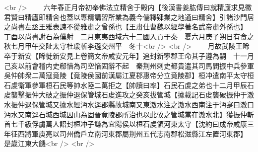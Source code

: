 <br />
　　六年春正月帝初奉佛法立精舍于殿内【後漢書姜肱傳曰就精廬求見徵君賢曰精廬即精舍也蓋以專精講習所業為義今儒釋肄業之地通曰精舍】引諸沙門居之尚書左丞王雅表諫不從雅肅之曾孫也【王肅仕曹魏以經學著名武帝肅外孫也】　丁酉以尚書謝石為僕射　二月東夷西域六十二國入貢于秦　夏六月庚子朔日有食之秋七月甲午交阯太守杜瑗斬李遜交州平　冬十<br />
<br />
　　月故武陵王晞卒于新安【晞徙新安見上卷簡文帝咸安元年】追封新寧郡王命其子遵為嗣　十一月己亥以前會稽内史郗愔為司空愔固辭不起　秦荆州刺史都貴遣其司馬閻振中兵參軍吳仲帥衆二萬寇竟陵【竟陵侯國前漢屬江夏郡惠帝分立竟陵郡】桓冲遣南平太守桓石䖍衛軍參軍桓石民等帥水陸二萬拒之【帥讀曰率】石民石䖍之弟也十二月甲辰石䖍襲擊振仲大破之振仲退保管城石䖍進攻之癸亥拔管城【據載記石䖍襲破振仲于滶水振仲退保管城又據水經沔水逕郡縣故城南又東滶水注之滶水西南注于沔寔曰滶口沔水又南逕石城西城因山為固晉竟陵郡所治也以此攷之管城當在滶水北】獲振仲斬首七千級俘虜萬人詔封桓冲子謙為宜陽侯以桓石䖍領河東太守【沈約曰成帝咸康三年征西將軍庾亮以司州僑戶立南河東郡屬荆州五代志南郡松滋縣江左置河東郡】　是歲江東大饑<br />
<br />
